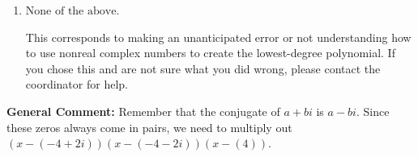 \documentclass{extbook}[14pt]
\begin{document}
\begin{enumerate}
{\begin{enumerate}[label=\Alph*.]
$x^{3} + x^{2} -6 x + 8$, which corresponds to multiplying out $(x -2)(x -4)$.
\item \( \text{None of the above.} \)

This corresponds to making an unanticipated error or not understanding how to use nonreal complex numbers to create the lowest-degree polynomial. If you chose this and are not sure what you did wrong, please contact the coordinator for help.
\end{enumerate}

\textbf{General Comment:} Remember that the conjugate of $a+bi$ is $a-bi$. Since these zeros always come in pairs, we need to multiply out $(x-(-4 + 2 i))(x-(-4 - 2 i))(x-(4))$.
}
\end{enumerate}
\end{document}
